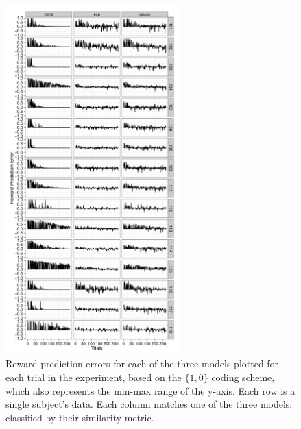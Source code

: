 \begin{figure}[tp]
    \includegraphics[width=0.6\textwidth]{f_rpe_acc}
    \centering
    \caption{Reward prediction errors for each of the three models plotted for each trial in the experiment, based on the $\{1,0\}$ coding scheme, which also represents the min-max range of the y-axis.  Each row is a single subject's data.  Each column matches one of the three models, classified by their similarity metric.}
    \label{fig:rpeacc}
\end{figure}

